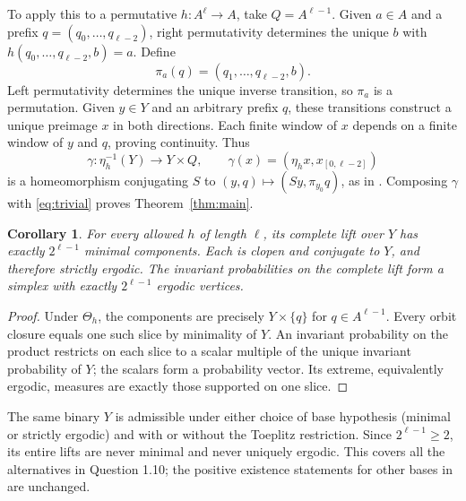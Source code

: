 \documentclass[11pt]{article}
\newtheorem{corollary}[theorem]{Corollary}
\begin{document}
To apply this to a permutative $h:A^\ell\to A$, take $Q=A^{\ell-1}$. Given $a\in A$ and a prefix $q=(q_0,\ldots,q_{\ell-2})$, right permutativity determines the unique $b$ with $h(q_0,\ldots,q_{\ell-2},b)=a$. Define
\[
 \pi_a(q)=(q_1,\ldots,q_{\ell-2},b).
\]
Left permutativity determines the unique inverse transition, so $\pi_a$ is a permutation. Given $y\in Y$ and an arbitrary prefix $q$, these transitions construct a unique preimage $x$ in both directions. Each finite window of $x$ depends on a finite window of $y$ and $q$, proving continuity. Thus
\[
 \gamma:\eta_h^{-1}(Y)\longrightarrow Y\times Q,
 \qquad \gamma(x)=(\eta_hx,x_{[0,\ell-2]})
\]
is a homeomorphism conjugating $S$ to $(y,q)\mapsto(Sy,\pi_{y_0}q)$, as in \cite[Theorem 1.3]{KJ}. Composing $\gamma$ with \eqref{eq:trivial} proves Theorem~\ref{thm:main}.

\begin{corollary}\label{cor:components}
For every allowed $h$ of length $\ell$, its complete lift over $Y$ has exactly $2^{\ell-1}$ minimal components. Each is clopen and conjugate to $Y$, and therefore strictly ergodic. The invariant probabilities on the complete lift form a simplex with exactly $2^{\ell-1}$ ergodic vertices.
\end{corollary}
\begin{proof}
Under $\Theta_h$, the components are precisely $Y\times\{q\}$ for $q\in A^{\ell-1}$. Every orbit closure equals one such slice by minimality of $Y$. An invariant probability on the product restricts on each slice to a scalar multiple of the unique invariant probability of $Y$; the scalars form a probability vector. Its extreme, equivalently ergodic, measures are exactly those supported on one slice.
\end{proof}

The same binary $Y$ is admissible under either choice of base hypothesis (minimal or strictly ergodic) and with or without the Toeplitz restriction. Since $2^{\ell-1}\geq2$, its entire lifts are never minimal and never uniquely ergodic. This covers all the alternatives in Question 1.10; the positive existence statements for other bases in \cite[Theorem 1.9(a),(d)]{KJ} are unchanged.
\end{document}
